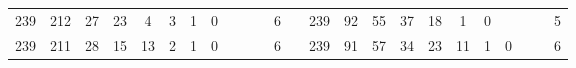 {\begin{tabular}{cccccccccccclccccccccccc}
239                                                & 212                                                & 27                                               & 23                                               & 4                                                & 3                                                & 1                                               & 0                                               &                                                 &                                                 &                                                 & 6                                                &                          & 239                                                & 92                                                 & 55                                               & 37                                               & 18                                              & 1                                               & 0                                               &                                                 &                                                 &                                                 & 5                                                \\
239                                                & 211                                                & 28                                               & 15                                               & 13                                               & 2                                                & 1                                               & 0                                               &                                                 &                                                 &                                                 & 6                                                &                          & 239                                                & 91                                                 & 57                                               & 34                                               & 23                                              & 11                                              & 1                                               & 0                                               &                                                 &                                                 & 6                                                \\

\end{tabular}}
